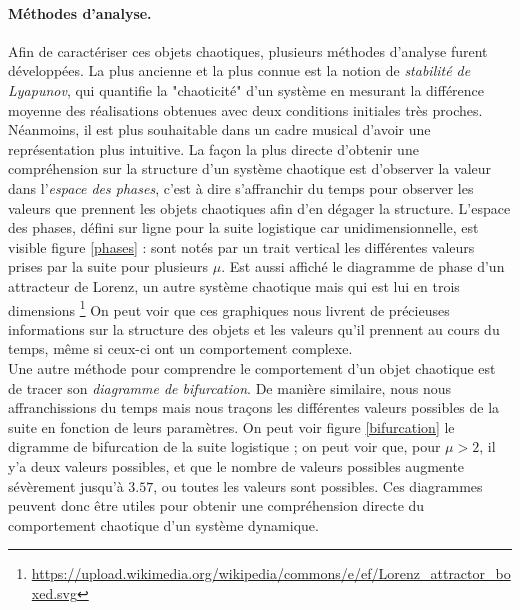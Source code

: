 \documentclass[12pt,a4paper]{article}
\begin{document}
\paragraph{Méthodes d'analyse.} Afin de caractériser ces objets chaotiques, plusieurs méthodes d'analyse furent développées. La plus ancienne et la plus connue est la notion de \textit{stabilité de Lyapunov}, qui quantifie la "chaoticité" d'un système en mesurant la différence moyenne des réalisations obtenues avec deux conditions initiales très proches. Néanmoins, il est plus souhaitable dans un cadre musical d'avoir une représentation plus intuitive.
La façon la plus directe d'obtenir une compréhension sur la structure d'un système chaotique est d'observer la valeur dans l'\textit{espace des phases}, c'est à dire s'affranchir du temps pour observer les valeurs que prennent les objets chaotiques afin d'en dégager la structure. L'espace des phases, défini sur ligne pour la suite logistique car unidimensionnelle, est visible figure \ref{phases} : sont notés par un trait vertical les différentes valeurs prises par la suite pour plusieurs $\mu$. Est aussi affiché le diagramme de phase d'un attracteur de Lorenz, un autre système chaotique mais qui est lui en trois dimensions \footnote{\url{https://upload.wikimedia.org/wikipedia/commons/e/ef/Lorenz_attractor_boxed.svg}} On peut voir que ces graphiques nous livrent de précieuses informations sur la structure des objets et les valeurs qu'il prennent au cours du temps, même si ceux-ci ont un comportement complexe. \\

Une autre méthode pour comprendre le comportement d'un objet chaotique est de tracer son \textit{diagramme de bifurcation}. De manière similaire, nous nous affranchissions du temps mais nous traçons les différentes valeurs possibles de la suite en fonction de leurs paramètres. On peut voir figure \ref{bifurcation} le digramme de bifurcation de la suite logistique ; on peut voir que, pour $\mu > 2$, il y'a deux valeurs possibles, et que le nombre de valeurs possibles augmente sévèrement jusqu'à $3.57$, ou toutes les valeurs sont possibles. Ces diagrammes peuvent donc être utiles pour obtenir une compréhension directe du comportement chaotique d'un système dynamique. 
\end{document}
